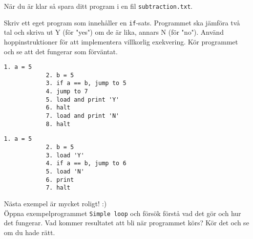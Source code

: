 \begin{Datorarbete}
    \noindent När du är klar så spara ditt program i en fil \texttt{subtraction.txt}.


    \item {} Skriv ett eget program som innehåller en \texttt{if}-sats. Programmet ska jämföra två tal och skriva ut Y (för "yes") om de är lika, annars N (för "no"). Använd hoppinstruktioner för att implementera villkorlig exekvering. Kör programmet och se att det fungerar som förväntat.

    \begin{minipage}[t]{0.42\textwidth}
        \begin{lstlisting}[xleftmargin=-15mm]
            1. a = 5
            2. b = 5
            3. if a == b, jump to 5
            4. jump to 7
            5. load and print 'Y'
            6. halt
            7. load and print 'N'
            8. halt
        \end{lstlisting}
    \end{minipage}
    \begin{minipage}[t]{0.42\textwidth}
        \begin{lstlisting}[xleftmargin=-15mm]
            1. a = 5
            2. b = 5
            3. load 'Y'
            4. if a == b, jump to 6
            5. load 'N'
            6. print
            7. halt
        \end{lstlisting}
    \end{minipage}

    \item {} Nästa exempel är mycket roligt! :) \\
    Öppna exempelprogrammet \texttt{Simple loop} och försök förstå vad det gör och hur det fungerar. Vad kommer resultatet att bli när programmet körs? Kör det och se om du hade rätt.

    \newpage


\end{Datorarbete}
